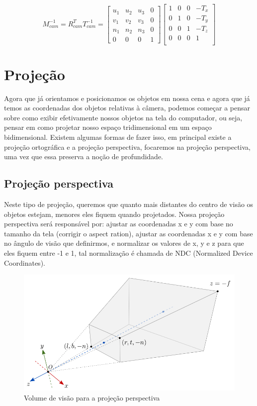 \documentclass[12pt]{article}
\begin{document}
\[
M_{cam}^{-1} = R_{cam}^T T_{cam}^{-1} = 
\begin{bmatrix}
    u_1 & u_2 & u_3 & 0   \\
    v_1 & v_2 & v_3 & 0   \\    
    n_1 & n_2 & n_3 & 0   \\
    0 & 0 & 0 & 1
\end{bmatrix}
\begin{bmatrix}
    1 & 0 & 0 & -T_{x} \\
    0 & 1 & 0 & -T_{y} \\
    0 & 0 & 1 & -T_{z} \\
    0 & 0 & 0 & 1 \\
\end{bmatrix}
\]

\section{Projeção}

Agora que já orientamos e posicionamos os objetos em nossa cena e agora que já temos as coordenadas dos objetos relativas à câmera, podemos começar a pensar sobre como exibir efetivamente nossos objetos na tela do computador, ou seja, pensar em como projetar nosso espaço tridimensional em um espaço bidimensional. Existem algumas formas de fazer isso, em principal existe a projeção ortográfica e a projeção perspectiva, focaremos na projeção perspectiva, uma vez que essa preserva a noção de profundidade. 


\subsection{Projeção perspectiva}

Neste tipo de projeção, queremos que quanto mais distantes do centro de visão os objetos estejam, menores eles fiquem quando projetados. Nossa projeção perspectiva será responsável por: ajustar as coordenadas x e y com base no tamanho da tela (corrigir o aspect ration), ajustar as coordenadas x e y com base no ângulo de visão que definirmos, e normalizar os valores de x, y e z para que eles fiquem entre -1 e 1, tal normalização é chamada de NDC (Normalized Device Coordinates). 

\begin{figure}[H]
    \centering
    \includegraphics[width=0.6\linewidth]{imgs/08_projection7.png}
    \caption{Volume de visão para a projeção perspectiva}
\end{figure}
\end{document}
